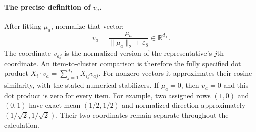 \documentclass[11pt,a4paper]{article}
\numberwithin{equation}{section}
\begin{document}
\paragraph{The precise definition of $v_a$.}
After fitting $\mu_a$, normalize that vector:
\begin{equation}\label{groupdirection}
 \boxed{v_a=\frac{\mu_a}{\lVert\mu_a\rVert_2+\varepsilon_8}
 \in\mathbb R^{d_X}.}
\end{equation}
The coordinate $v_{aj}$ is the normalized version of the representative's
$j$th coordinate. An item-to-cluster comparison is therefore the fully specified
dot product $X_i\cdot v_a=\sum_{j=1}^{d_X} X_{ij}v_{aj}$. For nonzero vectors it
approximates their cosine similarity, with the stated numerical stabilizers.
If $\mu_a=0$, then $v_a=0$ and this dot product is zero for every item.
For example, two assigned rows $(1,0)$ and $(0,1)$ have exact mean
$(1/2,1/2)$ and normalized direction approximately $(1/\sqrt2,1/\sqrt2)$.
Their two coordinates remain separate throughout the calculation.
\end{document}
